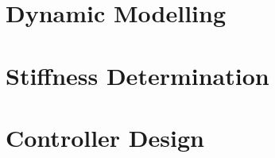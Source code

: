 \documentclass[11pt,twoside]{report}
\begin{document}
\newpage
\begin{spacing}{1}

\end{spacing}

\cleardoublepage

\begin{appendices}

\chapter{Dynamic Modelling}

\cleardoublepage

\chapter{Stiffness Determination}

\cleardoublepage

\chapter{Controller Design}

\cleardoublepage
\end{appendices}
\end{document}
